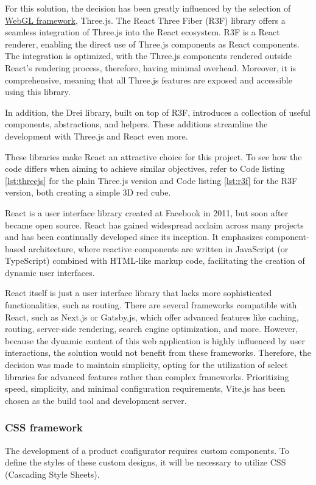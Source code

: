 For this solution, the decision has been greatly influenced by the selection of \hyperref[section:WebGL]{WebGL framework}, Three.js. The React Three Fiber (R3F) library offers a seamless integration of Three.js into the React ecosystem. R3F is a React renderer, enabling the direct use of Three.js components as React components. The integration is optimized, with the Three.js components rendered outside React's rendering process, therefore, having minimal overhead. Moreover, it is comprehensive, meaning that all Three.js features are exposed and accessible using this library. \cite{R3F}

In addition, the Drei library, built on top of R3F, introduces a collection of useful components, abstractions, and helpers. These additions streamline the development with Three.js and React even more. \cite{Drei}

These libraries make React an attractive choice for this project. To see how the code differs when aiming to achieve similar objectives, refer to Code listing \ref{lst:threejs} for the plain Three.js version and Code listing \ref{lst:r3f} for the R3F version, both creating a simple 3D red cube.

React is a user interface library created at Facebook in 2011, but soon after became open source. React has gained widespread acclaim across many projects and has been continually developed since its inception. It emphasizes component-based architecture, where reactive components are written in JavaScript (or TypeScript) combined with HTML-like markup code, facilitating the creation of dynamic user interfaces. \cite{Banks2020}

React itself is just a user interface library that lacks more sophisticated functionalities, such as routing. There are several frameworks compatible with React, such as Next.js or Gatsby.js, which offer advanced features like caching, routing, server-side rendering, search engine optimization, and more. However, because the dynamic content of this web application is highly influenced by user interactions, the solution would not benefit from these frameworks. \cite{Eze2023} Therefore, the decision was made to maintain simplicity, opting for the utilization of select libraries for advanced features rather than complex frameworks. Prioritizing speed, simplicity, and minimal configuration requirements, Vite.js has been chosen as the build tool and development server. \cite{Said2023}


\subsubsection{CSS framework}
The development of a product configurator requires custom components. To define the styles of these custom designs, it will be necessary to utilize CSS (Cascading Style Sheets).

